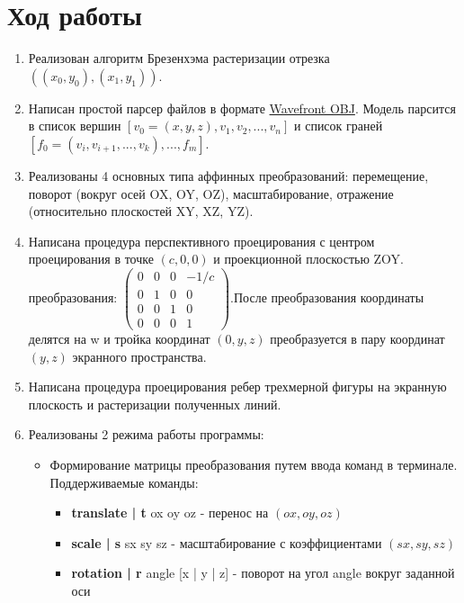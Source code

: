\documentclass[a4paper,12pt]{article}
\begin{document}
\section{\normalsize{Ход работы}}
\begin{flushleft}
  \begin{enumerate}
    \item Реализован алгоритм Брезенхэма растеризации отрезка \(((x_0, y_0),(x_1,y_1))\).
    \item Написан простой парсер файлов в формате \href{https://ru.wikipedia.org/wiki/Obj}{Wavefront OBJ}. Модель парсится в список вершин \([v_0 = (x, y, z), v_1, v_2, ..., v_n]\) и список граней \([f_0 = (v_i, v_{i+1}, ..., v_k), ..., f_m]\).
    \item Реализованы 4 основных типа аффинных преобразований: перемещение, поворот (вокруг осей OX, OY, OZ), масштабирование, отражение (относительно плоскостей XY, XZ, YZ).
    \item Написана процедура перспективного проецирования с центром проецирования в точке \((c, 0, 0)\) и проекционной плоскостью ZOY.  преобразования: \(\begin{pmatrix}0 & 0 & 0 & - 1/c \\ 0 & 1 & 0 & 0 \\ 0 & 0 & 1 & 0 \\ 0 & 0 & 0 & 1\end{pmatrix}\).\linebreak После преобразования координаты делятся на w и тройка координат \((0, y, z)\) преобразуется в пару координат \((y, z)\) экранного пространства. 
    \item Написана процедура проецирования ребер трехмерной фигуры на экранную плоскость и растеризации полученных линий.
    \item Реализованы 2 режима работы программы:
      \linebreak
      \begin{itemize}
        \item Формирование матрицы преобразования путем ввода команд в терминале. Поддерживаемые команды:
          \linebreak
          \begin{itemize}
            \item \textbf{translate | t} ox oy oz - перенос на \((ox, oy, oz)\)
            \item \textbf{scale | s} sx sy sz - масштабирование с коэффициентами \((sx, sy, sz)\)
            \item \textbf{rotation | r} angle [x | y | z] - поворот на угол angle вокруг заданной оси

\end{itemize}
\end{itemize}
\end{enumerate}
\end{flushleft}
\end{document}
